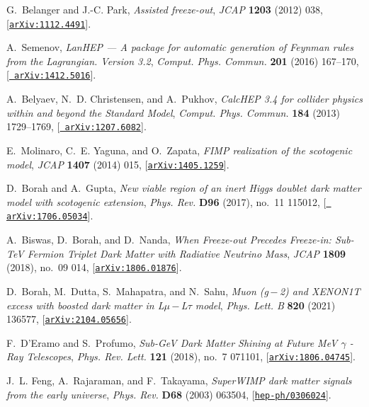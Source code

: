 \documentclass[prd,nofootinbib,preprint,superscriptaddress]{revtex4}
\begin{document}
\begin{thebibliography}{100}
G.~Belanger and J.-C. Park, {\it {Assisted freeze-out}},  {\em JCAP} {\bf 1203}
  (2012) 038, [\href{http://arxiv.org/abs/1112.4491}{{\tt arXiv:1112.4491}}].

A.~Semenov, {\it {LanHEP — A package for automatic generation of Feynman
  rules from the Lagrangian. Version 3.2}},  {\em Comput. Phys. Commun.} {\bf
  201} (2016) 167--170, [\href{http://arxiv.org/abs/1412.5016}{{\tt
  arXiv:1412.5016}}].

A.~Belyaev, N.~D. Christensen, and A.~Pukhov, {\it {CalcHEP 3.4 for collider
  physics within and beyond the Standard Model}},  {\em Comput. Phys. Commun.}
  {\bf 184} (2013) 1729--1769, [\href{http://arxiv.org/abs/1207.6082}{{\tt
  arXiv:1207.6082}}].

E.~Molinaro, C.~E. Yaguna, and O.~Zapata, {\it {FIMP realization of the
  scotogenic model}},  {\em JCAP} {\bf 1407} (2014) 015,
  [\href{http://arxiv.org/abs/1405.1259}{{\tt arXiv:1405.1259}}].

D.~Borah and A.~Gupta, {\it {New viable region of an inert Higgs doublet dark
  matter model with scotogenic extension}},  {\em Phys. Rev.} {\bf D96} (2017),
  no.~11 115012, [\href{http://arxiv.org/abs/1706.05034}{{\tt
  arXiv:1706.05034}}].

A.~Biswas, D.~Borah, and D.~Nanda, {\it {When Freeze-out Precedes Freeze-in:
  Sub-TeV Fermion Triplet Dark Matter with Radiative Neutrino Mass}},  {\em
  JCAP} {\bf 1809} (2018), no.~09 014,
  [\href{http://arxiv.org/abs/1806.01876}{{\tt arXiv:1806.01876}}].

D.~Borah, M.~Dutta, S.~Mahapatra, and N.~Sahu, {\it {Muon
  (g \ensuremath{-} 2) and XENON1T excess with boosted dark matter in
  L\ensuremath{\mu} \ensuremath{-} L\ensuremath{\tau} model}},  {\em Phys.
  Lett. B} {\bf 820} (2021) 136577,
  [\href{http://arxiv.org/abs/2104.05656}{{\tt arXiv:2104.05656}}].

F.~D'Eramo and S.~Profumo, {\it {Sub-GeV Dark Matter Shining at Future MeV
  $\gamma$ -Ray Telescopes}},  {\em Phys. Rev. Lett.} {\bf 121} (2018), no.~7
  071101, [\href{http://arxiv.org/abs/1806.04745}{{\tt arXiv:1806.04745}}].

J.~L. Feng, A.~Rajaraman, and F.~Takayama, {\it {SuperWIMP dark matter signals
  from the early universe}},  {\em Phys. Rev.} {\bf D68} (2003) 063504,
  [\href{http://arxiv.org/abs/hep-ph/0306024}{{\tt hep-ph/0306024}}].


\end{thebibliography}
\end{document}
